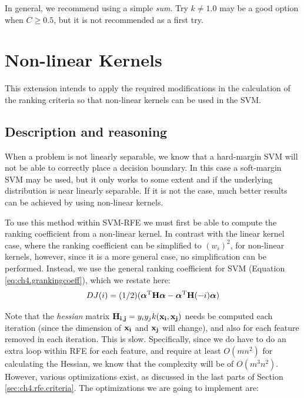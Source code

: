In general, we recommend using a simple \emph{sum}. Try $k \neq 1.0$ may be a good option when $C \ge 0.5$, but it is not recommended as a first try. 


\section{Non-linear Kernels}

This extension intends to apply the required modifications in the calculation of the ranking criteria so that non-linear kernels can be used in the SVM.

\subsection{Description and reasoning}
\label{sec:ch5.kernel.desc}

When a problem is not linearly separable, we know that a hard-margin SVM will not be able to correctly place a decision boundary. In this case a soft-margin SVM may be used, but it only works to some extent and if the underlying distribution is near linearly separable. If it is not the case, much better results can be achieved by using non-linear kernels.

To use this method within SVM-RFE we must first be able to compute the ranking coefficient from a non-linear kernel. In contrast with the linear kernel case, where the ranking coefficient can be simplified to $(w_i)^2$, for non-linear kernels, however, since it is a more general case, no simplification can be performed. Instead, we use the general ranking coefficient for SVM (Equation \ref{eq:ch4.grankingcoeff}), which we restate here:
\begin{align*}
    DJ(i) = (1/2)(\boldsymbol{\alpha}^{\text{T}} \mathbf{H} \boldsymbol{\alpha} - \boldsymbol{\alpha}^{\text{T}} \mathbf{H}(-i) \boldsymbol{\alpha})
\end{align*}

Note that the \emph{hessian} matrix $\mathbf{H_{i,j}} = y_iy_jk(\mathbf{x_i}, \mathbf{x_j})$ needs be computed each iteration (since the dimension of $\mathbf{x_i}$ and $\mathbf{x_j}$ will change), and also for each feature removed in each iteration. This is slow. Specifically, since we do have to do an extra loop within RFE for each feature, and require at least $O(mn^2)$ for calculating the Hessian, we know that the complexity will be of $O(m^3n^2)$. However, various optimizations exist, as discussed in the last parts of Section \ref{sec:ch4.rfe.criteria}. The optimizations we are going to implement are:

